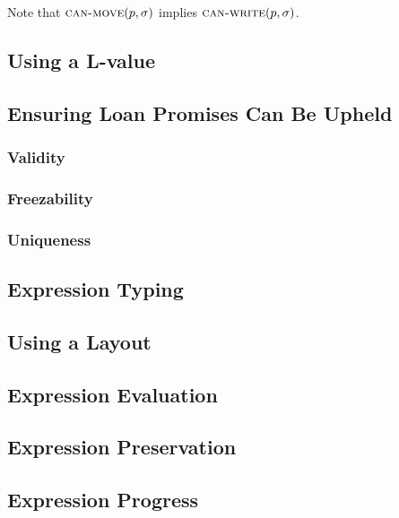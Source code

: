 

Note that $\textsc{can-move}({p},{\sigma})$ implies $\textsc{can-write}({p},{\sigma})$.

\subsection*{Using a L-value}

\subsection*{Ensuring Loan Promises Can Be Upheld}
\subsubsection*{Validity}
\subsubsection*{Freezability}
\subsubsection*{Uniqueness}

\subsection*{Expression Typing}

\subsection*{Using a Layout}

\subsection*{Expression Evaluation}

\subsection*{Expression Preservation}

\subsection*{Expression Progress}
